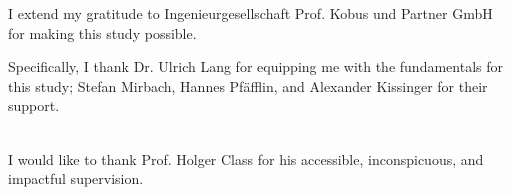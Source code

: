 \newpage
\thispagestyle{empty}

\vspace*{3cm}

\begin{center}
I extend my gratitude to Ingenieurgesellschaft Prof. Kobus und Partner GmbH for making this study possible.
\end{center}

Specifically, I thank Dr. Ulrich Lang for equipping me with the fundamentals for this study; Stefan Mirbach, Hannes Pfäfflin, and Alexander Kissinger for their support.
\\ \\
\begin{center}
I would like to thank Prof. Holger Class for his accessible, inconspicuous, and impactful supervision.
\end{center}

\endinput